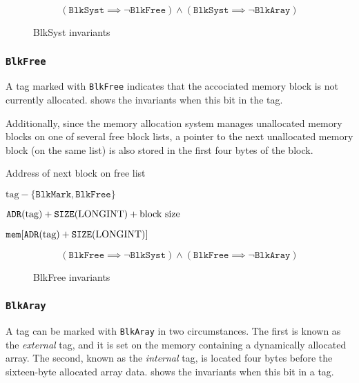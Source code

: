 \begin{figure}[h]
    $$(\texttt{BlkSyst} \implies \neg \texttt{BlkFree}) \wedge
    (\texttt{BlkSyst} \implies \neg \texttt{BlkAray})$$
  \caption{BlkSyst invariants}
  \label{memlay:blksyst-invariants}
\end{figure}

\subsubsection{\texttt{BlkFree}}\label{memlay:descriptors-kind-blkfree}

A tag marked with \texttt{BlkFree} indicates that the accociated
memory block is not currently allocated.
 shows the invariants when this bit
in the tag.

Additionally, since the memory allocation system manages unallocated
memory blocks on one of several free block lists, a pointer to the
next unallocated memory block (on the same list) is also stored in the
first four bytes of the block.

\begin{Ventry}{Address of next block on free list}
\item[Size of block]      $\textrm{tag} - \lbrace\texttt{BlkMark}, \texttt{BlkFree}\rbrace$
\item[Address of next block]  $\texttt{ADR}(\textrm{tag}) + \texttt{SIZE}(\textrm{LONGINT}) + \textrm{block size}$
\item[Address of next block on free list] $\texttt{mem}\lbrack\texttt{ADR}(\textrm{tag}) + \texttt{SIZE}(\textrm{LONGINT})\rbrack$
\end{Ventry}


\begin{figure}[h]
    $$(\texttt{BlkFree} \implies \neg \texttt{BlkSyst}) \wedge
    (\texttt{BlkFree} \implies \neg \texttt{BlkAray})$$
  \caption{BlkFree invariants}
  \label{memlay:blkfree-invariants}
\end{figure}

\subsubsection{\texttt{BlkAray}}\label{memlay:descriptors-kind-blkaray}

A tag can be marked with \texttt{BlkAray} in two circumstances.  The
first is known as the \emph{external} tag, and it is set on the memory
containing a dynamically allocated array.  The second, known as the
\emph{internal} tag, is located four bytes before the sixteen-byte
allocated array data.   shows the
invariants when this bit in a tag.

